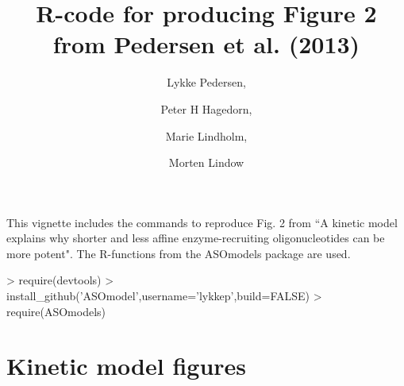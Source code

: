 \documentclass{article}
\title{R-code for producing Figure 2 from Pedersen et al. (2013)}
\author{Lykke Pedersen, \and Peter H Hagedorn, \and Marie Lindholm, \and Morten Lindow}
\date{}
\begin{document}



\maketitle
This vignette includes the commands to reproduce Fig. 2 from ``A kinetic model explains why shorter and less
affine enzyme-recruiting oligonucleotides can be
more potent". The R-functions from the ASOmodels package are used.
\begin{Schunk}
\begin{Sinput}
> require(devtools)
> install_github('ASOmodel',username='lykkep',build=FALSE)
> require(ASOmodels)
\end{Sinput}
\end{Schunk}

\section*{Kinetic model figures}

\end{document}
